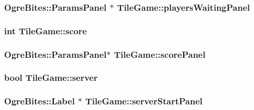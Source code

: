 \hypertarget{classTileGame_a6ec622cd0062396ffa3e929702fc870d}{
\subsubsection[{players\-Waiting\-Panel}]{\setlength{\rightskip}{0pt plus 5cm}Ogre\-Bites\-::\-Params\-Panel $\ast$ Tile\-Game\-::players\-Waiting\-Panel\hspace{0.3cm}{\ttfamily [protected]}}}\label{classTileGame_a6ec622cd0062396ffa3e929702fc870d}
\hypertarget{classTileGame_abba0100f7c52d2a9ae1bfa0f5bbee4a5}{
\subsubsection[{score}]{\setlength{\rightskip}{0pt plus 5cm}int Tile\-Game\-::score\hspace{0.3cm}{\ttfamily [protected]}}}\label{classTileGame_abba0100f7c52d2a9ae1bfa0f5bbee4a5}
\hypertarget{classTileGame_a9a4d1b4dfacca55fdeacf454af04fa0c}{
\subsubsection[{score\-Panel}]{\setlength{\rightskip}{0pt plus 5cm}Ogre\-Bites\-::\-Params\-Panel$\ast$ Tile\-Game\-::score\-Panel\hspace{0.3cm}{\ttfamily [protected]}}}\label{classTileGame_a9a4d1b4dfacca55fdeacf454af04fa0c}
\hypertarget{classTileGame_a8f1f5171595cb9819f47ad2c9849e810}{
\subsubsection[{server}]{\setlength{\rightskip}{0pt plus 5cm}bool Tile\-Game\-::server\hspace{0.3cm}{\ttfamily [protected]}}}\label{classTileGame_a8f1f5171595cb9819f47ad2c9849e810}
\hypertarget{classTileGame_a788abd4a926b8492ba5db8f4d87a41a7}{
\subsubsection[{server\-Start\-Panel}]{\setlength{\rightskip}{0pt plus 5cm}Ogre\-Bites\-::\-Label $\ast$ Tile\-Game\-::server\-Start\-Panel\hspace{0.3cm}{\ttfamily [protected]}}}\label{classTileGame_a788abd4a926b8492ba5db8f4d87a41a7}
